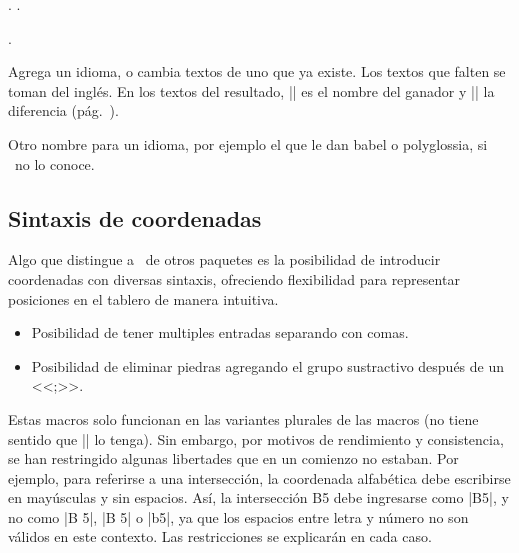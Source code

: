 \begin{goban}[9, stone = {radius = 4pt}, mark = {line = {color = red}}]
\begin{command}{\pgfgotext{}}
	\begin{codeexample}[]
		. .

		.
	\end{codeexample}
\end{command}

\begin{command}{\pgfgodefinelanguage{}}
	Agrega un idioma, o cambia textos de uno que ya existe. Los textos que falten se toman del inglés. En los textos del resultado, |\pgfgowinner| es el nombre del ganador y |\pgfgopoints| la diferencia (pág.~\pageref{subsec:sgf}).

	\begin{codeexample}
	\end{codeexample}
\end{command}

\begin{command}{\pgfgolanguagealias{}}
	Otro nombre para un idioma, por ejemplo el que le dan babel o polyglossia, si \pgfgoname\ no lo conoce.

	\begin{codeexample}
	\end{codeexample}
\end{command}

\subsection{Sintaxis de coordenadas}
\label{subsec:sintaxis-de-coordenadas}

Algo que distingue a \pgfgoname\ de otros paquetes es la posibilidad de introducir coordenadas con diversas sintaxis, ofreciendo flexibilidad para representar posiciones en el tablero de manera intuitiva. 
\begin{itemize}
	\item Posibilidad de tener multiples entradas separando con comas.
	\item Posibilidad de eliminar piedras agregando el grupo sustractivo despu\'es de un <<;>>.
\end{itemize}

Estas macros solo funcionan en las variantes plurales de las macros (no tiene sentido que |\stone| lo tenga). Sin embargo, por motivos de rendimiento y consistencia, se han restringido algunas libertades que en un comienzo no estaban. Por ejemplo, para referirse a una intersección, la coordenada alfabética debe escribirse en mayúsculas y sin espacios. Así, la intersección B5 debe ingresarse como |B5|, y no como |B 5|, |B  5| o |b5|, ya que los espacios entre letra y número no son válidos en este contexto. Las restricciones se explicarán en cada caso.



\end{goban}

